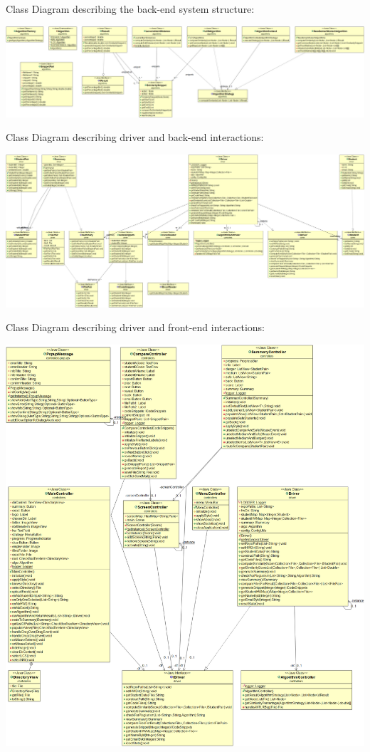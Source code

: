\documentclass[12pt]{article}
\begin{document}



Class Diagram describing the back-end system structure:\\
\begin{center}
    \includegraphics[scale = 0.20, angle = 90]{UML1.png}
\end{center}
\pagebreak
Class Diagram describing driver and back-end interactions:\\
\begin{center}
    \includegraphics[scale = 0.19, angle = 90]{UML2.png}
\end{center}
\pagebreak
Class Diagram describing driver and front-end interactions:\\
\begin{center}
    \includegraphics[scale = 0.25]{UML3.png}
\end{center}
\end{document}

